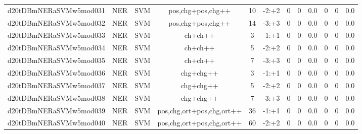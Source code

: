 \documentclass[a4paper]{article}
\begin{document}
\begin{landscape}
\begin{center}
\begin{tabular}{ |c|c|c|c|c|c|c|c|c|c|c|c|}
 
 	
 	\small{ d20tDBmNERaSVMw5mod031 } & \small{ NER} & \small{  SVM }  & pos,chg+pos,chg++  &  10 &  \small{  -2:+2 }  &  0 & 0 & 0.0  &  0 & 0 & 0.0 \\
 	

 
 	
 	\small{ d20tDBmNERaSVMw5mod032 } & \small{ NER} & \small{  SVM }  & pos,chg+pos,chg++  &  14 &  \small{  -3:+3 }  &  0 & 0 & 0.0  &  0 & 0 & 0.0 \\
 	

 
 	
 	\small{ d20tDBmNERaSVMw5mod033 } & \small{ NER} & \small{  SVM }  & ch+ch++  &  3 &  \small{  -1:+1 }  &  0 & 0 & 0.0  &  0 & 0 & 0.0 \\
 	

 
 	
 	\small{ d20tDBmNERaSVMw5mod034 } & \small{ NER} & \small{  SVM }  & ch+ch++  &  5 &  \small{  -2:+2 }  &  0 & 0 & 0.0  &  0 & 0 & 0.0 \\
 	

 
 	
 	\small{ d20tDBmNERaSVMw5mod035 } & \small{ NER} & \small{  SVM }  & ch+ch++  &  7 &  \small{  -3:+3 }  &  0 & 0 & 0.0  &  0 & 0 & 0.0 \\
 	

 
 	
 	\small{ d20tDBmNERaSVMw5mod036 } & \small{ NER} & \small{  SVM }  & chg+chg++  &  3 &  \small{  -1:+1 }  &  0 & 0 & 0.0  &  0 & 0 & 0.0 \\
 	

 
 	
 	\small{ d20tDBmNERaSVMw5mod037 } & \small{ NER} & \small{  SVM }  & chg+chg++  &  5 &  \small{  -2:+2 }  &  0 & 0 & 0.0  &  0 & 0 & 0.0 \\
 	

 
 	
 	\small{ d20tDBmNERaSVMw5mod038 } & \small{ NER} & \small{  SVM }  & chg+chg++  &  7 &  \small{  -3:+3 }  &  0 & 0 & 0.0  &  0 & 0 & 0.0 \\
 	

 
 	
 	\small{ d20tDBmNERaSVMw5mod039 } & \small{ NER} & \small{  SVM }  & pos,chg,ort+pos,chg,ort++  &  36 &  \small{  -1:+1 }  &  0 & 0 & 0.0  &  0 & 0 & 0.0 \\
 	

 
 	
 	\small{ d20tDBmNERaSVMw5mod040 } & \small{ NER} & \small{  SVM }  & pos,chg,ort+pos,chg,ort++  &  60 &  \small{  -2:+2 }  &  0 & 0 & 0.0  &  0 & 0 & 0.0 \\
 	


\end{tabular}
\end{center}
\end{landscape}
\end{document}
